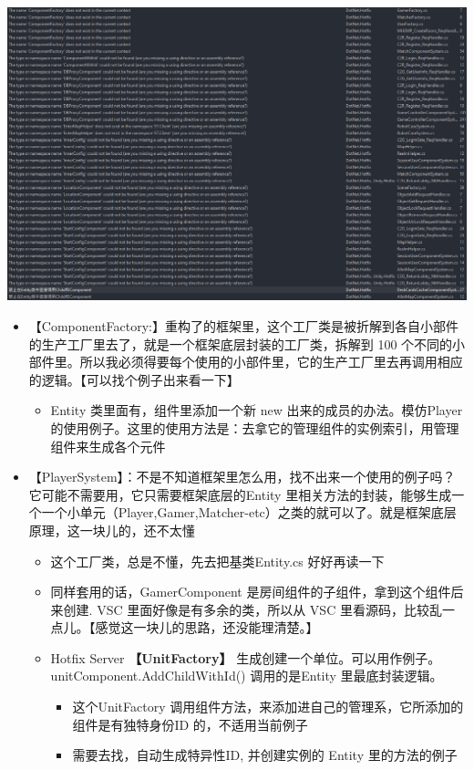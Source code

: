 \documentclass[9pt, b5paper]{article}
\begin{document}
\includegraphics[width=.9\linewidth]{./pic/et4_20230616_165750.png}
\begin{itemize}
\item 【ComponentFactory:】重构了的框架里，这个工厂类是被折解到各自小部件的生产工厂里去了，就是一个框架底层封装的工厂类，拆解到 100 个不同的小部件里。所以我必须得要每个使用的小部件里，它的生产工厂里去再调用相应的逻辑。【可以找个例子出来看一下】
\begin{itemize}
\item Entity 类里面有，组件里添加一个新 new 出来的成员的办法。模仿Player 的使用例子。这里的使用方法是：去拿它的管理组件的实例索引，用管理组件来生成各个元件
\end{itemize}
\item 【PlayerSystem】：不是不知道框架里怎么用，找不出来一个使用的例子吗？它可能不需要用，它只需要框架底层的Entity 里相关方法的封装，能够生成一个一个小单元（Player,Gamer,Matcher-etc）之类的就可以了。就是框架底层原理，这一块儿的，还不太懂
\begin{itemize}
\item 这个工厂类，总是不懂，先去把基类Entity.cs 好好再读一下
\item 同样套用的话，GamerComponent 是房间组件的子组件，拿到这个组件后来创建. VSC 里面好像是有多余的类，所以从 VSC 里看源码，比较乱一点儿。【感觉这一块儿的思路，还没能理清楚。】
\item Hotfix Server \textbf{【UnitFactory】} 生成创建一个单位。可以用作例子。unitComponent.AddChildWithId() 调用的是Entity 里最底封装逻辑。
\begin{itemize}
\item 这个UnitFactory 调用组件方法，来添加进自己的管理系，它所添加的组件是有独特身份ID 的，不适用当前例子
\item 需要去找，自动生成特异性ID, 并创建实例的 Entity 里的方法的例子
\end{itemize}

\end{itemize}
\end{itemize}
\end{document}
